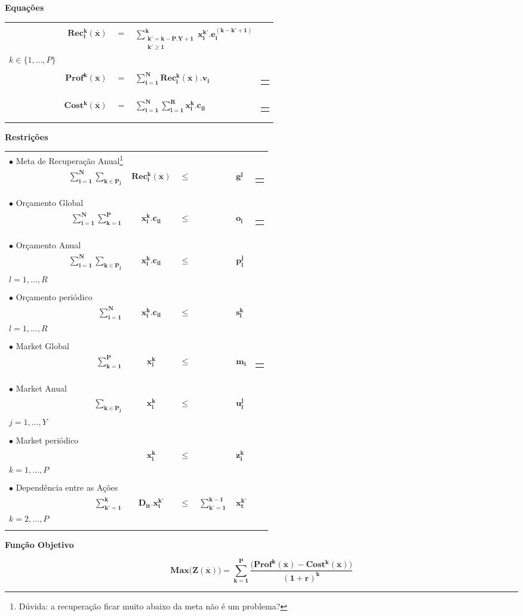 \documentclass{article}
\newcommand{\topico}[1]{
  \vspace{20pt}
  {\Large \bf #1 }
}
\newenvironment{restricoes}
  { \begin{longtable}{lrcclll}}
  {\end{longtable} }
\newcommand{\restricao}[7]{
    \multicolumn{2}{l}{ $\bullet$ #1} & & \\ \nopagebreak
    & ${ \displaystyle \bm{#2} }$
    & ${ \bm{#3} }$
    & ${ \bm{#4} }$
    & ${ \displaystyle \bm{#5} }$
    & ${ \bm{#6} }$
	& \begin{tabular}{l}
	  #7
    \end{tabular}
	\\ \hspace{30pt}
}
\newenvironment{equacoes}
	{ \begin{longtable}{lrcll} }
	{ \end{longtable} }
\newcommand{\equacao}[4]{
    \multicolumn{5}{l}{\text{ \parbox{250pt}{$\bullet$ #1} }} \\   %
    \phantom{aaaaaa} & $ \displaystyle \bm{#2} $                              %
    & $ = $                 
	& $\displaystyle \bm{#3} $                           %
	&
	\begin{tabular}{l}
	  #4                                 %
	\end{tabular}
	\vspace{12pt}
	\\
}
\begin{document}
\topico{Equações}

\begin{equacoes}
    \equacao
	  {Recuperação de energia para o período $k$ causada pelas as ações $i$ de todos os períodos.}
	  {Rec_{i}^{k}(\overline{x})}
	  {\sum_{\substack{k' = k-P.Y+1 \\ k' \geq 1}}^{k} x_i^{k'} . e_i^{(k-k'+1)}}
	  { $i \in \{1, \ldots, N\}$ \\ $k \in \{1, \ldots, P\}$ }
	\equacao
	  {Lucro originado pela energia recuperada no período $k$.}
	  {Prof^k(\overline{x})}
	  {\sum_{i=1}^N Rec_{i}^k(\overline{x}) . v_i}
	  { $k \in \{1, \ldots, P\}$}
	\equacao
	  {Custo total de todas as ações executadas no período $k$.}
	  {Cost^k(\overline{x})}
	  {\sum_{i=1}^N \sum_{l=1}^R x_i^k . c_{il}}
	  { $k \in \{1, \ldots, P\}$}
\end{equacoes}

\topico{Restrições}

\begin{restricoes}
    \restricao
	  {Meta de Recuperação Anual\footnote{Dúvida: a recuperação ficar muito abaixo da meta não é um problema?}}
	  { \sum_{i = 1}^N \sum_{k \in P_j}}
	  { Rec_i^k(\overline{x})}
	  { \leq }
	  { }
	  { g^j }
	  { $ j = 1, \ldots, Y $ }
	\\
    \restricao
	  {Orçamento Global}
	  { \sum_{i = 1}^N \sum_{k = 1}^P }
	  { x_i^k . c_{il}}
	  { \leq }
	  { }
	  { o_l }
	  { $ l = 1, \ldots, R $ }
	\\
    \restricao
      {Orçamento Anual}
      { \sum_{i = 1}^N \sum_{k \in P_j} }
      { x_i^k . c_{il} }
	  { \leq }
	  { }
	  { p_l^j }
	  { $ j = 1, \ldots, Y $ \\ $ l = 1, \ldots, R$ }
    \\
	\restricao
	  {Orçamento periódico}
      { \sum_{i = 1}^N }
      { x_i^k . c_{il} }
	  { \leq }
	  { }
	  { s_l^{k} }
	  { $ k = 1, \ldots, P $ \\ $ l = 1, \ldots, R $ }
	\\
	\restricao
	  {Market Global}
      { \sum_{k = 1}^P }
      { x_i^k }
	  { \leq }
	  { }
	  { m_i }
	  { $ i = 1, \ldots, N $ }
	\\
	\restricao
	  {Market Anual}
      { \sum_{k \in P_j} }
      { x_i^k }
	  { \leq }
	  { }
	  { u_i^j }
	  { $ i = 1, \ldots, N $ \\ $ j = 1, \ldots, Y $ }
	\\
	\restricao
	  {Market periódico}
      { }
      { x_i^k }
	  { \leq }
	  { }
	  { z_i^k }
	  { $ i = 1, \ldots, N $ \\ $ k = 1, \ldots, P$ }
	\\
	\restricao
	  {Dependência entre as Ações}
      { \sum_{k' = 1}^k }
      { D_{it} . x_i^{k'} }
	  { \leq }
	  { \sum_{k' = 1 }^{k-1} }
	  { x_t^{k'} }
	  { $i,t=1,\ldots,N$ \\ $k=2,\ldots,P$ }
\end{restricoes}

\topico{Função Objetivo}
\begin{equation}
  \nonumber
    \bm{
	  Max \big(Z(\overline{x})\big) =
	    \sum_{k=1}^P
	    \frac
		  {\big( Prof^k(\overline{x}) - Cost^k(\overline{x}) \big)}
	      {(1+r)^k}
	}
  \label{eq:budget}
\end{equation}

\vfill
\end{document}

